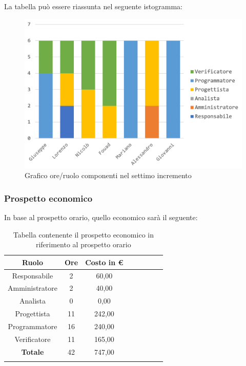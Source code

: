 		La tabella può essere riassunta nel seguente istogramma:
		\begin{figure}[H]
			\centering
			\includegraphics[width=0.8\linewidth]{./images/preventivo/incremento7-1.png}
			\caption{Grafico ore/ruolo componenti nel settimo incremento}
			\label{fig:grafico suddivione ruoli incremento VII}
		\end{figure}
		
		\subsubsection{Prospetto economico}
		In base al prospetto orario, quello economico sarà il seguente: 
		
		\begin{longtable}{|c|c|c|c|c|c|c|c|}
			\hline
			\rowcolor{lighter-grayer}
			\textbf{Ruolo} & \textbf{Ore} & \textbf{Costo in € } \\
			\hline
			\endfirsthead
			
			\hline
			Responsabile 	    & 2 & 60,00\\
			\hline 
			\hline
			Amministratore	   & 2 & 40,00\\
			\hline
			\hline
			Analista 				 & 0 & 0,00\\
			\hline
			\hline
			Progettista 		   & 11 & 242,00\\
			\hline
			\hline
			Programmatore 	  & 16 & 240,00\\
			\hline
			\hline
			Verificatore 		   & 11 & 165,00\\
			\hline
			\textbf{Totale} 	 & 42 & 747,00\\
			\hline
			\caption{Tabella contenente il prospetto economico in riferimento al prospetto orario}
		\end{longtable}
		\pagebreak
		
